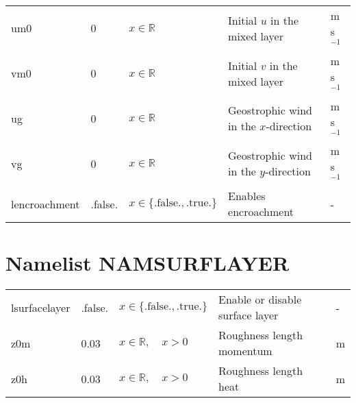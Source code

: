 \documentclass[twoside,11pt,fleqn,a4paper,english,openright]{report}
\begin{document}
\begin{center}
\begin{supertabular}{|l|p{1.6cm}|p{4cm}|p{5cm}|l|}
um0		&	0				&	$x \in \mathbb{R}$								&	Initial $u$ in the mixed layer	& m s$^{-1}$\\
vm0		&	0				&	$x \in \mathbb{R}$								&	Initial $v$ in the mixed layer	& m s$^{-1}$\\
ug		&	0				&	$x \in \mathbb{R}$								&	Geostrophic wind in the $x$-direction	& m s$^{-1}$\\
vg		&	0				&	$x \in \mathbb{R}$								&	Geostrophic wind in the $y$-direction	& m s$^{-1}$\\
lencroachment & .false.	&	$x\in\{\text{.false.},\text{.true.}\}$	& Enables encroachment	& -\\
\end{supertabular}
\end{center}

\section{Namelist NAMSURFLAYER}\label{par:namsl}

\begin{center}
  \tablehead{
  }
  \tabletail{
  }
  \tablelasttail{
        &&&&\\\hline
  }
\begin{supertabular}{|l|p{1.6cm}|p{4cm}|p{6.3cm}|l|}
  lsurfacelayer		&	.false.	&	$x\in\{\text{.false.},\text{.true.}\}$	& Enable or disable surface layer	& -\\
  z0m		&	0.03		&	$x \in \mathbb{R}, \quad x > 0$		& Roughness length momentum	&	m\\
  z0h		&	0.03		&	$x \in \mathbb{R}, \quad x > 0$		& Roughness length heat	&	m\\
\end{supertabular}
\end{center}
\newpage
\end{document}
